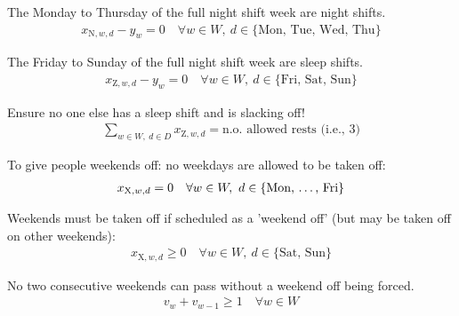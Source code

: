 \documentclass[a4paper]{article}
\begin{document}
The Monday to Thursday of the full night shift week are night shifts.
\begin{align}
  x_{\text{N}, w, d} - y_w = 0 \quad\forall w\in W,\ d\in \{\text{Mon, Tue, Wed, Thu}\}
\end{align}

The Friday to Sunday of the full night shift week are sleep shifts.
\begin{align}
  x_{\text{Z}, w, d} - y_w = 0 \quad\forall w\in W,\ d\in \{\text{Fri, Sat, Sun}\}
\end{align}

Ensure no one else has a sleep shift and is slacking off!
\begin{align}
  \sum_{w\in W,\ d\in D} x_{\text{Z}, w, d} = \text{n.o. allowed rests (i.e., 3)}
\end{align}

To give people weekends off: no weekdays are allowed to be taken off:
\begin{align}
  x_{\text{X}, w, d} = 0 \quad\forall w\in W,\ d\in \{\text{Mon, \dots, Fri}\}
\end{align}

Weekends must be taken off if scheduled as a 'weekend off' (but may be taken off on other weekends):
\begin{align}
  x_{\text{X}, w, d} \ge 0 \quad\forall w\in W,\ d\in \{\text{Sat, Sun}\}
\end{align}

No two consecutive weekends can pass without a weekend off being forced.
\begin{align}
  v_w + v_{w-1} \ge 1 \quad\forall w\in W
\end{align}
\end{document}
